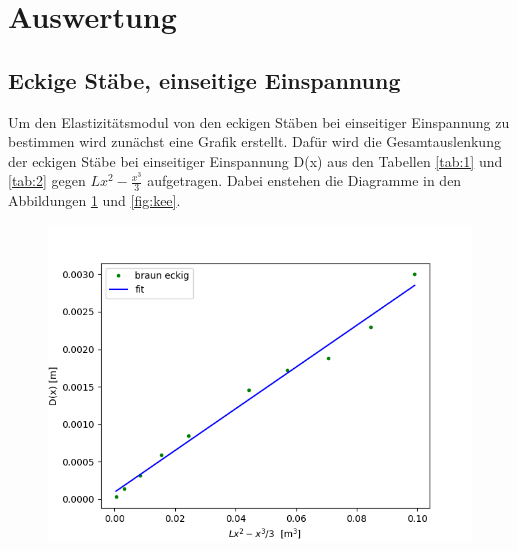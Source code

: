 \section{Auswertung}

\subsection{Eckige Stäbe, einseitige Einspannung}

Um den Elastizitätsmodul von den eckigen Stäben bei einseitiger Einspannung zu bestimmen wird zunächst eine Grafik erstellt. Dafür wird die Gesamtauslenkung der eckigen Stäbe bei einseitiger Einspannung D(x) aus den Tabellen \ref{tab:1} und \ref{tab:2} gegen $Lx^2-\frac{x^3}{3}$ aufgetragen. Dabei enstehen die Diagramme in den Abbildungen \ref{fig:bee} und \ref{fig:kee}.

\begin{figure}[H]
    \centering
    \includegraphics{bee.png}
    \label{fig:bee}
\end{figure}

